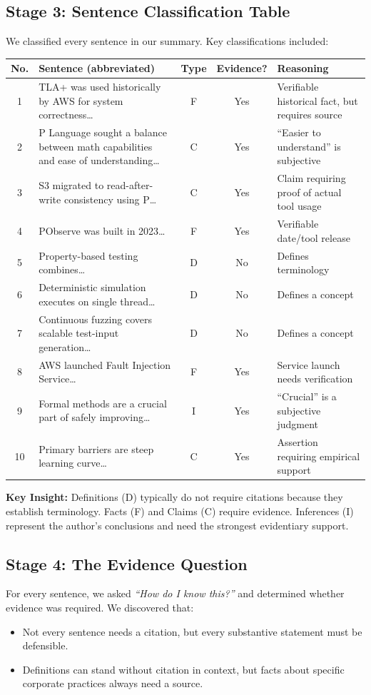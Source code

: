 \documentclass[11pt, a4paper]{article}
\begin{document}
\subsection{Stage 3: Sentence Classification Table}
We classified every sentence in our summary. Key classifications included:

\begin{longtable}{@{}c p{6cm} c c p{4cm}@{}}
    \toprule
    \textbf{No.} & \textbf{Sentence (abbreviated)} & \textbf{Type} & \textbf{Evidence?} & \textbf{Reasoning} \\
    \midrule
    \endhead
    1 & TLA+ was used historically by AWS for system correctness\ldots & F & Yes & Verifiable historical fact, but requires source \\
    2 & P Language sought a balance between math capabilities and ease of understanding\ldots & C & Yes & ``Easier to understand'' is subjective \\
    3 & S3 migrated to read-after-write consistency using P\ldots & C & Yes & Claim requiring proof of actual tool usage \\
    4 & PObserve was built in 2023\ldots & F & Yes & Verifiable date/tool release \\
    5 & Property-based testing combines\ldots & D & No & Defines terminology \\
    6 & Deterministic simulation executes on single thread\ldots & D & No & Defines a concept \\
    7 & Continuous fuzzing covers scalable test-input generation\ldots & D & No & Defines a concept \\
    8 & AWS launched Fault Injection Service\ldots & F & Yes & Service launch needs verification \\
    9 & Formal methods are a crucial part of safely improving\ldots & I & Yes & ``Crucial'' is a subjective judgment \\
    10 & Primary barriers are steep learning curve\ldots & C & Yes & Assertion requiring empirical support \\
    \bottomrule
\end{longtable}

\noindent\textbf{Key Insight:} Definitions (D) typically do not require citations because they establish terminology. Facts (F) and Claims (C) require evidence. Inferences (I) represent the author's conclusions and need the strongest evidentiary support.

\subsection{Stage 4: The Evidence Question}
For every sentence, we asked \textit{``How do I know this?''} and determined whether evidence was required. We discovered that:
\begin{itemize}[nosep]
    \item Not every sentence needs a citation, but every substantive statement must be defensible.
    \item Definitions can stand without citation in context, but facts about specific corporate practices always need a source.
\end{itemize}
\end{document}
